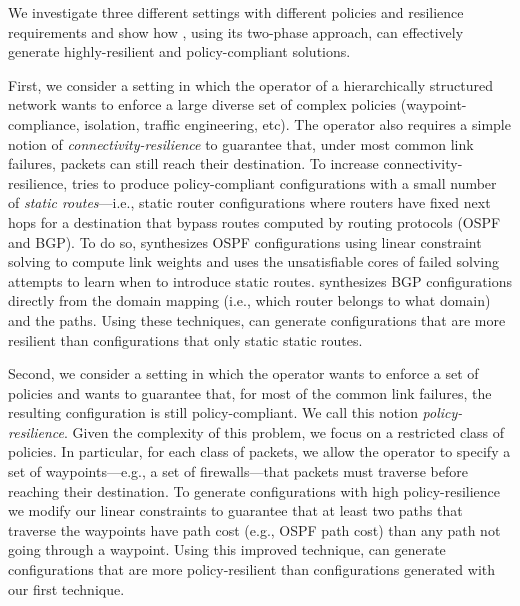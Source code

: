 We investigate three different settings with different policies and resilience requirements
and show how \name, using its two-phase approach, can effectively generate
highly-resilient and policy-compliant solutions.

First, we consider a setting in which the operator of a hierarchically
structured network wants to enforce a large diverse set of complex
policies (waypoint-compliance, isolation, traffic engineering, etc).
The operator also requires a simple notion of
\emph{connectivity-resilience} to guarantee that, under most common
link failures, packets can still reach their destination.
To increase connectivity-resilience, \name tries to produce
policy-compliant configurations with a small number of {\em static
  routes}---i.e., static router configurations where routers have
fixed next hops for a destination that bypass routes computed by routing protocols (OSPF and BGP).
To do so, \name synthesizes OSPF configurations using linear constraint solving to compute
link weights and uses the unsatisfiable cores
of failed solving attempts to learn when to introduce static routes.
\name synthesizes BGP configurations directly from the domain mapping (i.e., which router belongs to what domain) and the paths.
Using these techniques, \name can generate configurations that are
 more resilient than configurations that only static static routes.

Second, we consider a setting in which the operator wants to enforce a
set of policies and wants to guarantee that, for most of the common
link failures, the resulting configuration is still policy-compliant.
We call this notion \emph{policy-resilience}.  Given the complexity of
this problem, we focus on a {\rm restricted class} of policies.  In
particular, for each class of packets, we allow the operator to
specify a set of waypoints---e.g., a set of firewalls---that packets
must traverse before reaching their destination.  To generate
configurations with high policy-resilience we modify our linear
constraints to guarantee that at least two paths that traverse the
waypoints have path cost (e.g., OSPF path cost) than any path not
going through a waypoint.  Using this improved technique, \name can
generate configurations that are  more policy-resilient than
configurations generated with our first technique.


